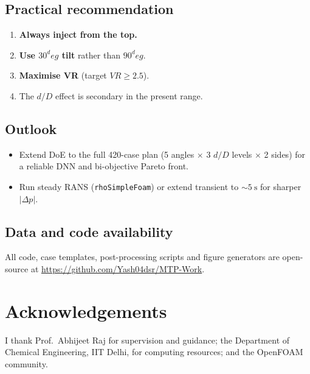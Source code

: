 \documentclass[10pt,a4paper]{article}
\def\dD{d/D}%
\def\VR{VR}%
\def\circ{ deg}%
\newcommand{\dD}{\ensuremath{d/D}}
\newcommand{\VR}{\ensuremath{\mathrm{VR}}}
\begin{document}
\subsection{Practical recommendation}
\begin{enumerate}
    \item \textbf{Always inject from the top.}
    \item \textbf{Use \(30^\circ\) tilt} rather than \(90^\circ\).
    \item \textbf{Maximise \VR{}} (target \(\VR\ge 2.5\)).
    \item The \(\dD\) effect is secondary in the present range.
\end{enumerate}

\subsection{Outlook}
\begin{itemize}
    \item Extend DoE to the full 420-case plan (5 angles
    \(\times\) 3 \(\dD\) levels \(\times\) 2 sides) for a
    reliable DNN and bi-objective Pareto front.
    \item Run steady RANS (\texttt{rhoSimpleFoam}) or extend
    transient to \(\sim\SI{5}{\second}\) for sharper \(|\Delta p|\).
\end{itemize}

\subsection{Data and code availability}
\label{sec:data_avail}
All code, case templates, post-processing scripts and figure
generators are open-source at
\url{https://github.com/Yash04dsr/MTP-Work}.

\section*{Acknowledgements}
I thank Prof.~Abhijeet Raj for supervision and guidance; the
Department of Chemical Engineering, IIT Delhi, for computing
resources; and the OpenFOAM community.



\end{document}
